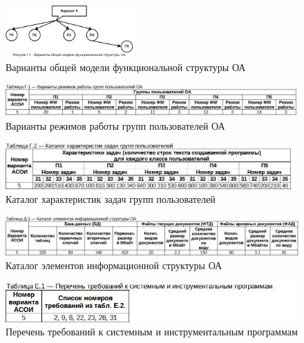 \documentclass[12pt, a4paper, simple]{eskdtext}
\begin{document}
    \begin{figure}[h!]
        \centering
        \includegraphics[height=2cm]
            {_docs/РисунокГ1ВариантыОбщейМоделиФункциональнойСтруктурыОА.png}
        \caption{Варианты общей модели функциональной структуры ОА}
    \end{figure}

    \begin{figure}[h!]
        \centering
        \includegraphics[width=14cm]
            {_docs/ТаблицаГ1ВариантыРежимовРаботыГруппПользователейОА.jpg}
        \caption{Варианты режимов работы групп пользователей ОА}
    \end{figure}

    \begin{figure}[h!]
        \centering
        \includegraphics[width=14cm]
            {_docs/ТаблицаГ2КаталогХарактеристикЗадачГруппПользователей.jpg}
        \caption{Каталог характеристик задач групп пользователей}
    \end{figure}

    \begin{figure}[ph!]
        \centering
        \includegraphics[width=16cm]
            {_docs/ТаблицаД1КаталогЭлементовИнформационнойСтруктурыОА.jpg}
        \caption{Каталог элементов информационной структуры ОА}
    \end{figure}

    \begin{figure}[ph!]
        \centering
        \includegraphics[]
            {_docs/ТаблицаЕ1ПереченьТребованийКСистемнымИИнструментальнымПрограммам.jpg}
        \caption{Перечень требований к системным и инструментальным программам}
    \end{figure}
\end{document}
